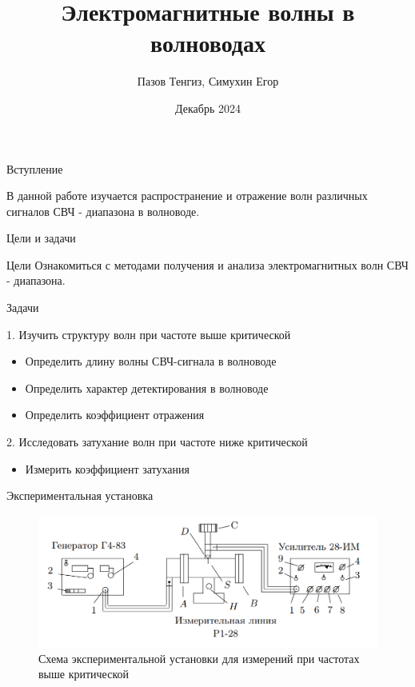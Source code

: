 \documentclass[12pt]{beamer}
\title[Волноводы]{Электромагнитные волны в волноводах}
\author{Пазов Тенгиз, Симухин Егор}
\date{Декабрь 2024}
\begin{document}
\maketitle

\begin{frame}{Вступление}

В данной работе изучается распространение и отражение волн различных сигналов СВЧ - диапазона в волноводе.
\end{frame}

\begin{frame}{Цели и задачи}
    \begin{block}{Цели}
        \centering
        Ознакомиться с методами получения и анализа электромагнитных волн СВЧ - диапазона.
    \end{block}

    \begin{block}{Задачи}
        \item 1. Изучить структуру волн при частоте выше критической
            \begin{itemize}
                \item Определить длину волны СВЧ-сигнала в волноводе
                \item Определить характер детектирования в волноводе
                \item Определить коэффициент отражения
            \end{itemize}
        \item 2. Исследовать затухание волн при частоте ниже критической
            \begin{itemize}
                \item Измерить коэффициент затухания
            \end{itemize}
    \end{block}

\end{frame}



\begin{frame}{Экспериментальная установка}
    \begin{figure}
        \centering
        \includegraphics[scale=0.4]{fig2.PNG}
        \caption{Схема экспериментальной установки для измерений при частотах выше критической}
        \label{fig:enter-label}
    \end{figure} 
\end{frame}
\end{document}
